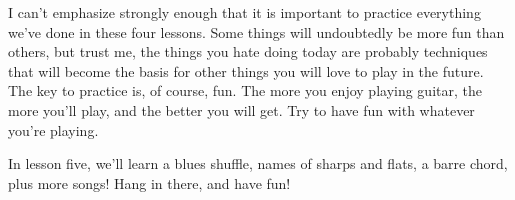 I can't emphasize strongly enough that it is important to practice everything we've done in these four lessons. Some things will undoubtedly be more fun than others, but trust me, the things you hate doing today are probably techniques that will become the basis for other things you will love to play in the future. The key to practice is, of course, fun. The more you enjoy playing guitar, the more you'll play, and the better you will get. Try to have fun with whatever you're playing.

In lesson five, we'll learn a blues shuffle, names of sharps and flats, a barre chord, plus more songs! Hang in there, and have fun!

